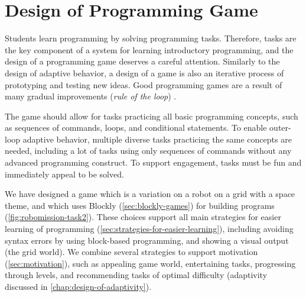 \chapter{Design of Programming Game}
\label{chap:design-of-game}


Students learn programming by solving programming tasks.
Therefore, tasks are the key component of a system for learning introductory
programming, and the design of a programming game deserves a careful attention.
Similarly to the design of adaptive behavior, a design of a game is also an iterative
process of prototyping and testing new ideas.
Good programming games are a result of many gradual improvements
(\emph{rule of the loop}) \cite{book-of-lenses}.


The game should allow for tasks practicing all basic
programming concepts, such as sequences of commands, loops, and conditional
statements. %
To enable outer-loop adaptive behavior, multiple diverse tasks practicing the same
concepts are needed, including a lot of tasks using only sequences of commands
without any advanced programming construct.
To support engagement, tasks must be fun and immediately appeal to be
solved.  %


We have designed a game which is a variation on a robot
on a grid with a space theme, and which uses Blockly (\cref{sec:blockly-games})
for building programs
(\cref{fig:robomission-task2}).
These choices support all main strategies for easier learning of programming
(\cref{sec:strategies-for-easier-learning}),
including
avoiding syntax errors by using block-based programming, and
showing a visual output (the grid world).
We combine several strategies to support motivation (\cref{sec:motivation}),
such as appealing game world, entertaining tasks, progressing through levels,
and recommending tasks of optimal difficulty
(adaptivity discussed in \cref{chap:design-of-adaptivity}).

